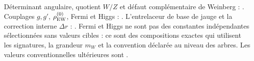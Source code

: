 \begin{statusbox}
Déterminant angulaire, quotient \(W/Z\) et défaut complémentaire de Weinberg :
. Couplages \(g,g'\), \(\rho_{\rm EW}^{(0)}\), Fermi et Higgs : . L’entrelaceur de base de jauge et la correction interne \(\Delta r\) : . Fermi et Higgs ne sont pas des constantes indépendantes sélectionnées sans valeurs cibles : ce sont des compositions exactes qui utilisent les signatures, la grandeur \(m_W\) et la convention déclarée au niveau des arbres. Les valeurs conventionnelles ultérieures sont .
\end{statusbox}
